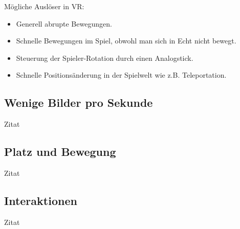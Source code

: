 \cite{_vr_quovadis}

\vspace{4cm}

Mögliche Auslöser in VR:
\begin{itemize}
\item Generell abrupte Bewegungen.
\item Schnelle Bewegungen im Spiel, obwohl man sich in Echt nicht bewegt.
\item Steuerung der Spieler-Rotation durch einen Analogstick.
\item Schnelle Positionsänderung in der Spielwelt wie z.B. Teleportation.
\end{itemize}


\subsection{Wenige Bilder pro Sekunde}
Zitat

\subsection{Platz und Bewegung}
Zitat

\subsection{Interaktionen}
Zitat